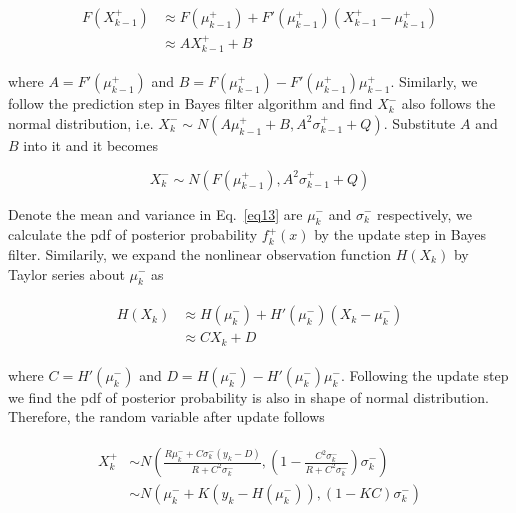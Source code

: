 \documentclass[conference]{IEEEtran}
\begin{document}
	\begin{equation}
	\begin{split}
	\begin{aligned}
	F(X_{k-1}^{+})&\approx F(\mu_{k-1}^{+})+{F}'(\mu_{k-1}^{+})(X_{k-1}^{+}-\mu_{k-1}^{+})\\
	&\approx AX_{k-1}^{+}+B
	\label{eq12}
	\end{aligned}
	\end{split}
	\end{equation}
	
	where $A={F}'(\mu_{k-1}^{+})$ and $B=F(\mu_{k-1}^{+})-{F}'(\mu_{k-1}^{+})\mu_{k-1}^{+}$. Similarly, we follow the prediction step in Bayes filter algorithm and find $X_{k}^{-}$ also follows the normal distribution, i.e. $X_{k}^{-} \sim N(A\mu_{k-1}^{+}+B, A^{2}\sigma_{k-1}^{+}+Q)$. Substitute $A$ and $B$ into it and it becomes
	
	\begin{equation}
		X_{k}^{-} \sim N(F(\mu_{k-1}^{+}), A^{2}\sigma_{k-1}^{+}+Q)
		\label{eq13}
	\end{equation}
	
	Denote the mean and variance in Eq.~\ref{eq13} are $\mu_{k}^{-}$ and $\sigma_{k}^{-}$ respectively, we calculate the pdf of posterior probability $f_{k}^{+}(x)$ by the update step in Bayes filter. Similarily, we expand the nonlinear observation function $H(X_{k})$ by Taylor series about $\mu_{k}^{-}$ as
	
	\begin{equation}
	\begin{split}
	\begin{aligned}
	H(X_{k})&\approx H(\mu_{k}^{-})+{H}'(\mu_{k}^{-})(X_{k}-\mu_{k}^{-})\\
	&\approx CX_{k}+D
	\label{eq14}
	\end{aligned}
	\end{split}
	\end{equation}
	
	where $C={H}'(\mu_{k}^{-})$ and $D=H(\mu_{k}^{-})-{H}'(\mu_{k}^{-})\mu_{k}^{-}$. Following the update step we find the pdf of posterior probability is also in shape of normal distribution. Therefore, the random variable after update follows 
	
	\begin{equation}
	\begin{split}
	\begin{aligned}
	X_{k}^{+} &\sim N(\frac{R\mu_{k}^{-}+C\sigma_{k}^{-}(y_{k}-D)}{R+C^{2}\sigma_{k}^{-}}, (1-\frac{C^{2}\sigma_{k}^{-}}{R+C^{2}\sigma_{k}^{-}})\sigma_{k}^{-})\\
	&\sim N(\mu_{k}^{-}+K(y_{k}-H(\mu_{k}^{-})), (1-KC)\sigma_{k}^{-})
	\label{eq15}
	\end{aligned}
	\end{split}
	\end{equation}
	
\end{document}
